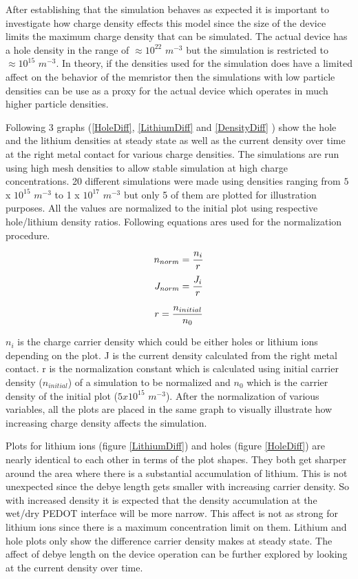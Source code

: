 \begin{doublespace}
After establishing that the simulation behaves as expected it is important to investigate how charge density effects this model since the size of the device limits the maximum charge density that can be simulated. The actual device has a hole density in the range of $ \approx 10^{22}$ $m^{-3}$ but the simulation is restricted to $\approx 10^{15}$ $m^{-3}$. In theory, if the densities used for the simulation does have a limited affect on the behavior of the memristor then the simulations with low particle densities can be use as a proxy for the actual device which operates in much higher particle densities.

 Following 3 graphs (\ref{HoleDiff}, \ref{LithiumDiff} and \ref{DensityDiff} ) show the hole and the lithium densities at steady state as well as the current density over time at the right metal contact for various charge densities. The simulations are run using high mesh densities to allow stable simulation at high charge concentrations. 20 different simulations were made using densities ranging from $5$ x $10^{15}$  $m^{-3}$ to 1 x $10^{17}$  $m^{-3}$ but only 5 of them are plotted for illustration purposes. All the values are normalized to the initial plot using respective hole/lithium density ratios. Following equations ares used for the normalization procedure.


\begin{equation}
\centering
n_{norm}= \frac{n_i}{r} 
\end{equation}
\begin{equation}
\centering
J_{norm}= \frac{J_i}{r} 
\end{equation}

\begin{equation}
\centering
r = \frac{n_{initial}}{n_{0}}
\label{NormConst}
\end{equation}

$n_{i}$ is the charge carrier density which could be either holes or lithium ions depending on the plot. J is the current density calculated from the right metal contact. r is the normalization constant which is calculated using initial carrier density ($n_{initial}$) of a simulation to be normalized and $n_{0}$ which is the carrier density of the initial plot ($5x10^{15}$ $m^{-3}$). After the normalization of various variables, all the plots are placed in the same graph to visually illustrate how increasing charge density affects the simulation. 

Plots for lithium ions (figure \ref{LithiumDiff}) and holes (figure \ref{HoleDiff}) are nearly identical to each other in terms of the plot shapes. They both get sharper around the area where there is a substantial accumulation of lithium. This is not unexpected since the debye length gets smaller with increasing carrier density. So with increased density it is expected that the density accumulation at the wet/dry PEDOT interface will be more narrow. This affect is not as strong for lithium ions since there is a maximum concentration limit on them. Lithium and hole plots only show the difference carrier density makes at steady state. The affect of debye length on the device operation can be further explored by looking at the current density over time.   


\end{doublespace}

